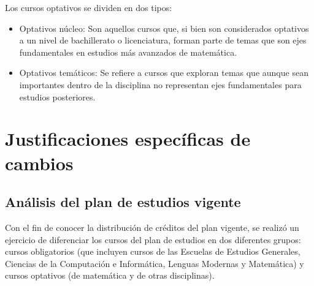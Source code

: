 \begin{refsection}
Los cursos optativos se dividen en dos tipos:
\begin{itemize}
    \item Optativos núcleo: Son aquellos cursos que, si bien son considerados optativos a un nivel de bachillerato o licenciatura, forman parte de temas que son ejes fundamentales en estudios más avanzados de matemática.
    \item Optativos temáticos: Se refiere a cursos que exploran temas que aunque sean importantes dentro de la disciplina no representan ejes fundamentales para estudios posteriores.
\end{itemize}



\section{Justificaciones específicas de cambios}


\subsection{Análisis del plan de estudios vigente}

Con el fin de conocer la distribución de créditos del plan vigente, se realizó un ejercicio de diferenciar los cursos del plan de estudios en dos diferentes grupos: cursos obligatorios (que incluyen cursos de las Escuelas de Estudios Generales, Ciencias de la Computación e Informática, Lenguas Modernas y Matemática) y cursos optativos (de matemática y de otras disciplinas).



\end{refsection}
